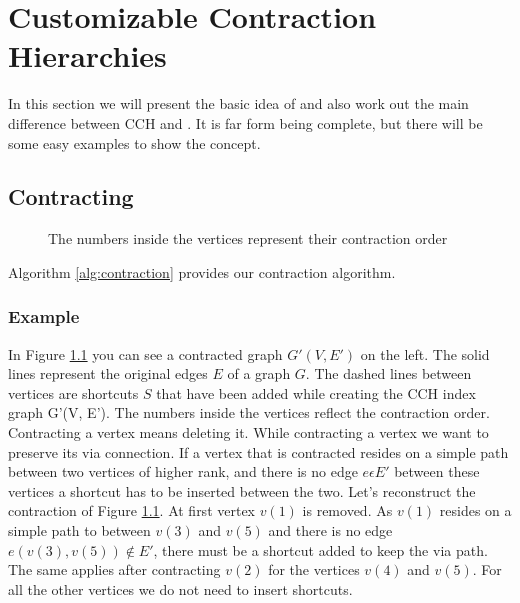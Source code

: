 \chapter{Customizable Contraction Hierarchies}\label{sec:Preliminary_CCH}

In this section we will present the basic idea of \cite[Customization Contraction Hierarchies]{CCH} and also work out the main difference between CCH and \cite[Contraction Hierarchies]{Geisberger_2012}.
It is far form being complete, but there will be some easy examples to show the concept. 

\section{Contracting}




\begin{figure}
    \centering
    
    \caption{The numbers inside the vertices represent their contraction order}
    \label{fig:contrating_and_searching}
\end{figure}

Algorithm \ref{alg:contraction} provides our contraction algorithm. 

\subsection{Example}

In Figure \ref{fig:contrating_and_searching} you can see a contracted graph $G'(V,E')$ on the left. The solid lines represent the original edges $E$ of a graph $G$. The dashed lines between vertices are shortcuts $S$ that 
have been added while creating the CCH index graph G'(V, E'). The numbers inside the vertices reflect the contraction order.
\\
Contracting a vertex means deleting it. While contracting a vertex we want to preserve its via connection. If a vertex that is contracted resides on a simple path between two vertices of higher rank,
and there is no edge $e \epsilon E'$ between these vertices a shortcut has to be inserted between the two. 
Let's reconstruct the contraction of Figure \ref{fig:contrating_and_searching}. At first vertex $v(1)$ is removed. As $v(1)$ resides on a simple path to between $v(3)$ and $v(5)$ and there is no edge $e(v(3), v(5)) \notin E'$,
there must be a shortcut added to keep the via path.
The same applies after contracting $v(2)$ for the vertices $v(4)$ and $v(5)$. For all the other vertices we do not need to insert shortcuts.

